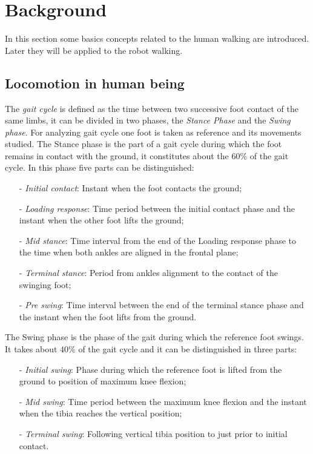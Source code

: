 \section{Background}
In this section some basics concepts related to the human walking are introduced. Later they will
be applied to the robot walking.
\subsection{Locomotion in human being}
The \emph{gait cycle} is defined as the time between two successive foot contact of the same limbs,
it can be divided in two phases, the \emph{Stance Phase}  and the \emph{Swing phase}.
For analyzing gait cycle one foot is taken as reference and its movements studied.
The Stance phase is the part of a gait cycle during which the foot remains in contact with the
ground, it constitutes about the $60\%$ of the gait cycle. In this phase five parts can be
distinguished:
\begin{itemize}
\item [-]\emph{Initial contact}: Instant when the foot contacts the ground;
\item [-]\emph{Loading response}: Time period between the initial contact phase and the instant
  when the other foot lifts the ground;
\item [-]\emph{Mid stance}: Time interval from the end of the Loading response phase to the time
  when both ankles are aligned in the frontal plane;
\item[-]\emph{Terminal stance}: Period from ankles alignment to the contact of the swinging foot;
\item[-]\emph{Pre swing}: Time interval between the end of the terminal stance phase and the instant
  when the foot lifts from the ground.
\end{itemize}
The Swing phase is the phase of the gait during which the reference foot swings. It takes about $40\%$ of the gait cycle and it can be distinguished in three parts:
\begin{itemize}
\item [-]\emph{Initial swing}: Phase during which the reference foot is lifted from the ground
  to position of maximum knee flexion;
\item [-]\emph{Mid swing}: Time period between the maximum knee flexion and the instant when the tibia reaches the vertical position;
\item[-]\emph{Terminal swing}: Following vertical tibia position to just prior to initial contact.
\end{itemize}
